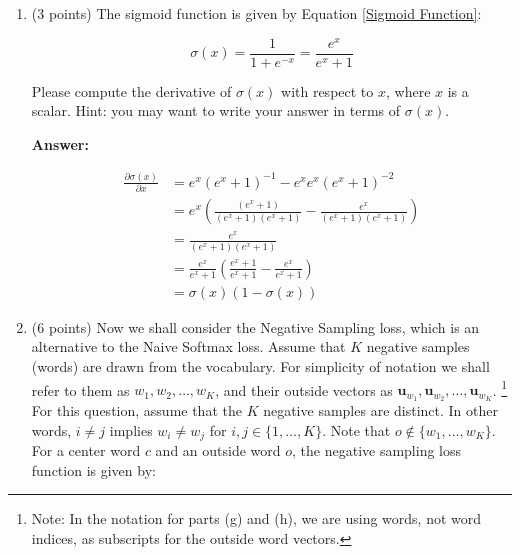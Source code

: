 \documentclass{article}
\newenvironment{answer}{
    {\bf Answer:} \sf \begingroup\color{red}
}{\endgroup}%
\begin{document}
\begin{enumerate}[label=(\alph*)]
\begin{shaded}
\begin{answer}
    \begin{equation}
        \frac{\partial f(x)}{\partial x}=1(x>0)
    \end{equation}
\end{answer}
\end{shaded}

\item (3 points) The sigmoid function is given by Equation \ref{Sigmoid Function}:

\begin{equation}
    \label{Sigmoid Function}
    \sigma (x) = \frac{1}{1 + e^{-x}} = \frac{e^{x}}{e^{x} + 1}
\end{equation}

Please compute the derivative of $\sigma(x)$ with respect to $x$, where $x$ is a scalar. Hint: you may want to write your answer in terms of $\sigma(x)$.

\begin{shaded}
\begin{answer}
    \begin{align}
        \frac{\partial \sigma(x)}{\partial x} &= e^{x}(e^x+1)^{-1}-e^{x}e^{x}(e^x+1)^{-2} \\
        &= e^{x}\left(\frac{(e^x+1)}{(e^x+1)(e^x+1)} - \frac{e^{x}}{(e^x+1)(e^x+1)}\right) \\
        &= \frac{e^{x}}{(e^x+1)(e^x+1)} \\
        &= \frac{e^{x}}{e^x+1}\left(\frac{e^x+1}{e^x+1}-\frac{e^x}{e^x+1}\right) \\
        &= \sigma(x)(1-\sigma(x))
    \end{align}
\end{answer}
\end{shaded}

\item (6 points) Now we shall consider the Negative Sampling loss, which is an alternative to the Naive Softmax loss.  Assume that $K$ negative samples (words) are drawn from the vocabulary. For simplicity of notation we shall refer to them as $w_1, w_2, \dots, w_K$, and their outside vectors as $\bm u_{w_1}, \bm u_{w_2}, \dots, \bm u_{w_K}$. \footnote{Note: In the notation for parts (g) and (h), we are using words, not word indices, as subscripts for the outside word vectors.} For this question, assume that the $K$ negative samples are distinct. In other words, $i\neq j$ implies $w_i\neq w_j$ for $i,j\in\{1,\dots,K\}$.
Note that $o\notin\{w_1, \dots, w_K\}$. 
For a center word $c$ and an outside word $o$, the negative sampling loss function is given by:


\end{enumerate}
\end{document}
